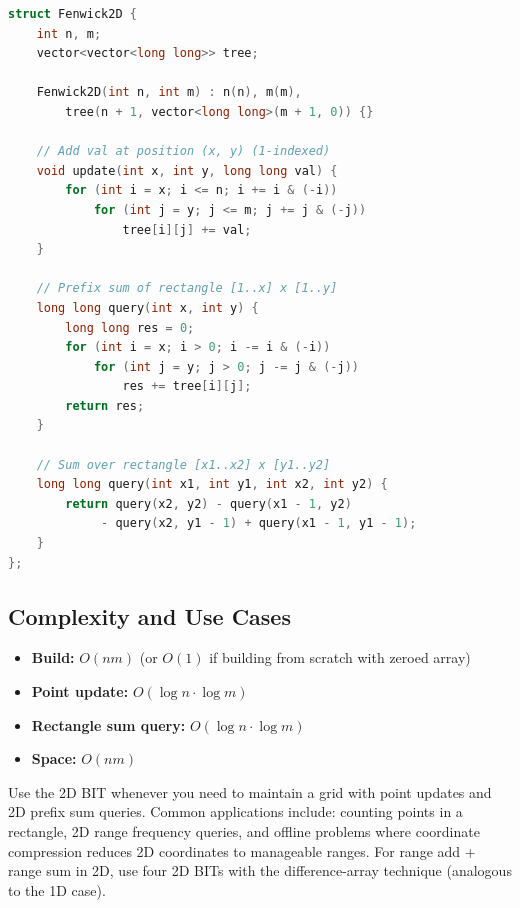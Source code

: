 \begin{lstlisting}[language=C++]
struct Fenwick2D {
    int n, m;
    vector<vector<long long>> tree;

    Fenwick2D(int n, int m) : n(n), m(m),
        tree(n + 1, vector<long long>(m + 1, 0)) {}

    // Add val at position (x, y) (1-indexed)
    void update(int x, int y, long long val) {
        for (int i = x; i <= n; i += i & (-i))
            for (int j = y; j <= m; j += j & (-j))
                tree[i][j] += val;
    }

    // Prefix sum of rectangle [1..x] x [1..y]
    long long query(int x, int y) {
        long long res = 0;
        for (int i = x; i > 0; i -= i & (-i))
            for (int j = y; j > 0; j -= j & (-j))
                res += tree[i][j];
        return res;
    }

    // Sum over rectangle [x1..x2] x [y1..y2]
    long long query(int x1, int y1, int x2, int y2) {
        return query(x2, y2) - query(x1 - 1, y2)
             - query(x2, y1 - 1) + query(x1 - 1, y1 - 1);
    }
};
\end{lstlisting}

\subsection{Complexity and Use Cases}

\begin{itemize}
\item \textbf{Build:} $O(nm)$ (or $O(1)$ if building from scratch with zeroed array)
\item \textbf{Point update:} $O(\log n \cdot \log m)$
\item \textbf{Rectangle sum query:} $O(\log n \cdot \log m)$
\item \textbf{Space:} $O(nm)$
\end{itemize}

Use the 2D BIT whenever you need to maintain a grid with point updates and 2D prefix sum queries. Common applications include: counting points in a rectangle, 2D range frequency queries, and offline problems where coordinate compression reduces 2D coordinates to manageable ranges. For range add + range sum in 2D, use four 2D BITs with the difference-array technique (analogous to the 1D case).


